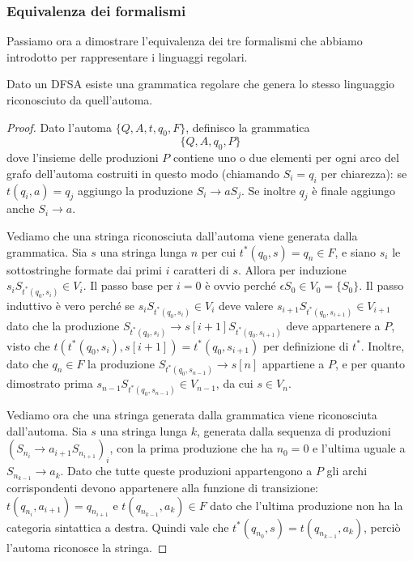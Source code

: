 \documentclass[12pt]{article}
\numberwithin{theorem}{subsection}
\begin{document}
\subsubsection{Equivalenza dei formalismi}
Passiamo ora a dimostrare l'equivalenza dei tre formalismi che abbiamo introdotto per rappresentare i linguaggi regolari.

\begin{lemma}
	Dato un DFSA esiste una grammatica regolare che genera lo stesso linguaggio riconosciuto da quell'automa.
\end{lemma}
\begin{proof}
	Dato l'automa $\{ Q, A, t, q_0, F \}$, definisco la grammatica
	\[
	\{ Q , A, q_0 , P \}
	\]
	dove l'insieme delle produzioni $P$ contiene uno o due elementi per ogni arco del grafo dell'automa costruiti in questo modo (chiamando $S_i = q_i$ per chiarezza): se $t(q_i, a) = q_j$ aggiungo la produzione $S_i \rightarrow a S_j$. Se inoltre $q_j$ è finale aggiungo anche $S_i \rightarrow a$.
	
	Vediamo che una stringa riconosciuta dall'automa viene generata dalla grammatica. Sia $s$ una stringa lunga $n$ per cui $t^*(q_0, s) = q_n \in F$, e siano $s_i$ le sottostringhe formate dai primi $i$ caratteri di $s$. Allora per induzione $s_i S_{t^*(q_0, s_i)} \in V_i$. Il passo base per $i=0$ è ovvio perché $\epsilon S_0 \in V_0 = \{ S_0 \}$. Il passo induttivo è vero perché se $s_i S_{t^*(q_0, s_i)} \in V_i$ deve valere $s_{i+1} S_{t^*(q_0, s_{i+1})} \in V_{i+1}$ dato che la produzione $S_{t^*(q_0, s_i)} \rightarrow s[i+1]S_{t^*(q_0, s_{i+1})}$ deve appartenere a $P$, visto che $t(t^*(q_0, s_i), s[i+1]) = t^*(q_0, s_{i+1})$ per definizione di $t^*$. Inoltre, dato che $q_n \in F$ la produzione $S_{t^*(q_0, s_{n-1})} \rightarrow s[n]$ appartiene a $P$, e per quanto dimostrato prima $s_{n-1}S_{t^*(q_0, s_{n-1})} \in V_{n-1}$, da cui $s \in V_n$.
	
	Vediamo ora che una stringa generata dalla grammatica viene riconosciuta dall'automa. Sia $s$ una stringa lunga $k$, generata dalla sequenza di produzioni $(S_{n_i} \rightarrow a_{i+1} S_{n_{i+1}})_i$, con la prima produzione che ha $n_0 = 0$ e l'ultima uguale a $S_{n_{k-1}} \rightarrow a_k$. Dato che tutte queste produzioni appartengono a $P$ gli archi corrispondenti devono appartenere alla funzione di transizione: $t(q_{n_i}, a_{i+1}) = q_{n_{i+1}}$ e $t(q_{n_{k-1}}, a_k) \in F$ dato che l'ultima produzione non ha la categoria sintattica a destra. Quindi vale che $t^*(q_{n_0}, s) = t(q_{n_{k-1}}, a_k)$, perciò l'automa riconosce la stringa.
\end{proof}
\end{document}
